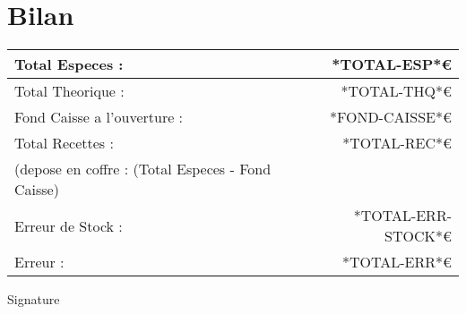 \documentclass{article}
\begin{document}
\section{Bilan}
\begin{tabular}{|l|r|}
\hline
Total Especes :& *TOTAL-ESP*\euro \\
\hline
Total Theorique :& *TOTAL-THQ*\euro \\
\hline
Fond Caisse a l'ouverture :& *FOND-CAISSE*\euro \\
\hline
Total Recettes :& *TOTAL-REC*\euro\\
(depose en coffre : (Total Especes  - Fond Caisse) & \\
\hline
Erreur de Stock :& *TOTAL-ERR-STOCK*\euro\\
\hline
Erreur :& *TOTAL-ERR*\euro\\
\hline
\end{tabular}


\vfill
\raggedleft
Signature\hspace{0.5cm} \makebox[1.5in]{\hrulefill}
\clearpage
\end{document}
